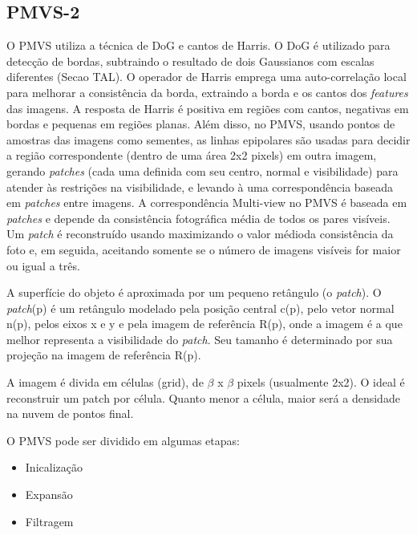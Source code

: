 \begin{itemize}
\subsection{PMVS-2}

O PMVS utiliza a técnica de DoG e cantos de Harris. O DoG é utilizado para detecção de bordas, subtraindo o resultado de dois Gaussianos com escalas diferentes (Secao TAL). O operador de Harris emprega uma auto-correlação local para melhorar a consistência da borda, extraindo a borda e os cantos dos {\it features} das imagens. A resposta de Harris é positiva em regiões com cantos, negativas em bordas e pequenas em regiões planas. Além disso, no PMVS, usando pontos de amostras das imagens como sementes, as linhas epipolares são usadas para decidir a região correspondente (dentro de uma área 2x2 pixels) em outra imagem, gerando {\it patches} (cada uma definida com seu centro, normal e visibilidade) para atender às restrições na visibilidade, e levando à uma correspondência baseada em {\it patches} entre imagens. A correspondência Multi-view no PMVS é baseada em {\it patches} e depende da consistência fotográfica média de todos os pares visíveis. Um {\it patch} é reconstruído usando maximizando o valor médioda consistência da foto e, em seguida, aceitando somente se o número de imagens visíveis for maior ou igual a três.  



A superfície do objeto é aproximada por um pequeno retângulo (o {\it patch}).
O {\it patch}(p) é um retângulo modelado pela posição central c(p), pelo vetor normal n(p), pelos eixos x e y e pela imagem de referência R(p), onde a imagem é a que melhor representa a visibilidade do {\it patch}. Seu tamanho é determinado por sua projeção na imagem de referência R(p).

A imagem é divida em células (grid), de $\beta$ x $\beta$ pixels (usualmente 2x2). O ideal é reconstruir um patch por célula. Quanto menor a célula, maior será a densidade na nuvem de pontos final.

O PMVS pode ser dividido em algumas etapas:

\begin{itemize}
\item{Inicalização}
\item{Expansão}
\item{Filtragem}
\end{itemize}


\end{itemize}
